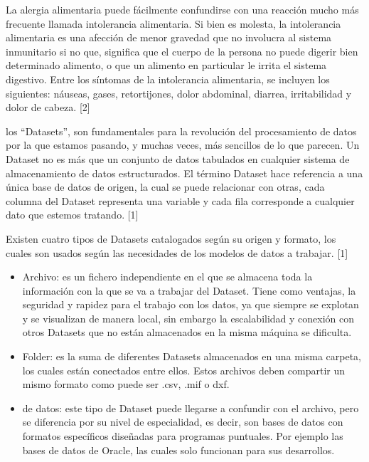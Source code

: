 \documentclass[
]{article}
\providecommand{\tightlist}{%
  \setlength{\itemsep}{0pt}\setlength{\parskip}{0pt}}
\begin{document}
La alergia alimentaria puede fácilmente confundirse con una reacción
mucho más frecuente llamada intolerancia alimentaria. Si bien es
molesta, la intolerancia alimentaria es una afección de menor gravedad
que no involucra al sistema inmunitario si no que, significa que el
cuerpo de la persona no puede digerir bien determinado alimento, o que
un alimento en particular le irrita el sistema digestivo. Entre los
síntomas de la intolerancia alimentaria, se incluyen los siguientes:
náuseas, gases, retortijones, dolor abdominal, diarrea, irritabilidad y
dolor de cabeza. {[}2{]}

los ``Datasets'', son fundamentales para la revolución del procesamiento
de datos por la que estamos pasando, y muchas veces, más sencillos de lo
que parecen. Un Dataset no es más que un conjunto de datos tabulados en
cualquier sistema de almacenamiento de datos estructurados. El término
Dataset hace referencia a una única base de datos de origen, la cual se
puede relacionar con otras, cada columna del Dataset representa una
variable y cada fila corresponde a cualquier dato que estemos tratando.
{[}1{]}

Existen cuatro tipos de Datasets catalogados según su origen y formato,
los cuales son usados según las necesidades de los modelos de datos a
trabajar. {[}1{]}

\begin{itemize}
\tightlist
\item
  Archivo: es un fichero independiente en el que se almacena toda la
  información con la que se va a trabajar del Dataset. Tiene como
  ventajas, la seguridad y rapidez para el trabajo con los datos, ya que
  siempre se explotan y se visualizan de manera local, sin embargo la
  escalabilidad y conexión con otros Datasets que no están almacenados
  en la misma máquina se dificulta.
\end{itemize}

\begin{itemize}
\tightlist
\item
  Folder: es la suma de diferentes Datasets almacenados en una misma
  carpeta, los cuales están conectados entre ellos. Estos archivos deben
  compartir un mismo formato como puede ser .csv, .mif o dxf.
\end{itemize}

\begin{itemize}
\tightlist
\item
  de datos: este tipo de Dataset puede llegarse a confundir con el
  archivo, pero se diferencia por su nivel de especialidad, es decir,
  son bases de datos con formatos específicos diseñadas para programas
  puntuales. Por ejemplo las bases de datos de Oracle, las cuales solo
  funcionan para sus desarrollos.
\end{itemize}
\end{document}
